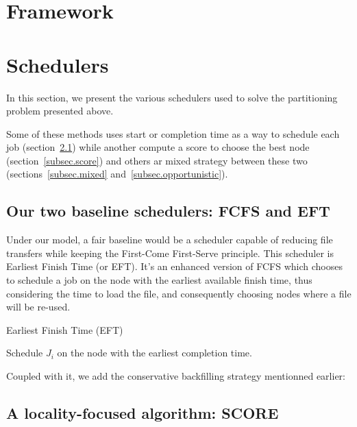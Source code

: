 \documentclass[conference,10pt]{IEEEtran}
\newcommand{\jobset}{\ensuremath{\mathbb{J}}\xspace}
\begin{document}

\section{Framework}\label{sec.framework}

\section{Schedulers}\label{sec.schedulers}

In this section, we present the various schedulers used to solve
the partitioning problem presented above. 

Some of these methods uses start or completion time as a way to
schedule each job (section~\ref{subsec.fcfs_eft}) while another compute 
a score to choose the best node (section~\ref{subsec.score}) and others
ar mixed strategy between these two (sections~\ref{subsec.mixed} and~\ref{subsec.opportunistic}).

\subsection{Our two baseline schedulers: FCFS and EFT}\label{subsec.fcfs_eft}

Under our model, a fair baseline would be a scheduler capable
of reducing file transfers while keeping the First-Come First-Serve 
principle. This scheduler is Earliest Finish Time (or EFT).
It's an enhanced version of FCFS which chooses to schedule a job
on the node with the earliest available finish time, thus considering
the time to load the file, and consequently choosing nodes where a file will
be re-used. 

\begin{algorithm}[htbp]
	\caption{Earliest Finish Time (EFT)}\label{algo.eft}
	\begin{algorithmic}[1]
		\For{$J_i \in \jobset$}
			\State Schedule $J_i$ on the node with the earliest completion time.
		\EndFor
	\end{algorithmic}
\end{algorithm}

Coupled with it, we add the conservative backfilling strategy mentionned earlier:

\subsection{A locality-focused algorithm: SCORE}
\end{document}
